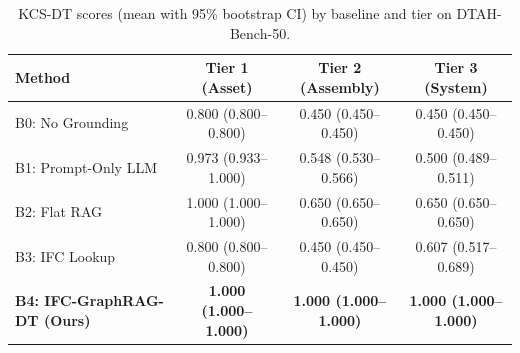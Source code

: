 \begin{table}[t]
\centering
\caption{KCS-DT scores (mean with 95\% bootstrap CI) by baseline and tier on DTAH-Bench-50.}
\label{tab:kcs_dt_results}
\begin{tabular}{lccc}
\toprule
Method & Tier 1 (Asset) & Tier 2 (Assembly) & Tier 3 (System) \\
\midrule
B0: No Grounding & 0.800 (0.800--0.800) & 0.450 (0.450--0.450) & 0.450 (0.450--0.450) \\
B1: Prompt-Only LLM & 0.973 (0.933--1.000) & 0.548 (0.530--0.566) & 0.500 (0.489--0.511) \\
B2: Flat RAG & 1.000 (1.000--1.000) & 0.650 (0.650--0.650) & 0.650 (0.650--0.650) \\
B3: IFC Lookup & 0.800 (0.800--0.800) & 0.450 (0.450--0.450) & 0.607 (0.517--0.689) \\
\midrule
\textbf{B4: IFC-GraphRAG-DT (Ours)} & \textbf{1.000 (1.000--1.000)} & \textbf{1.000 (1.000--1.000)} & \textbf{1.000 (1.000--1.000)} \\
\bottomrule
\end{tabular}
\end{table}